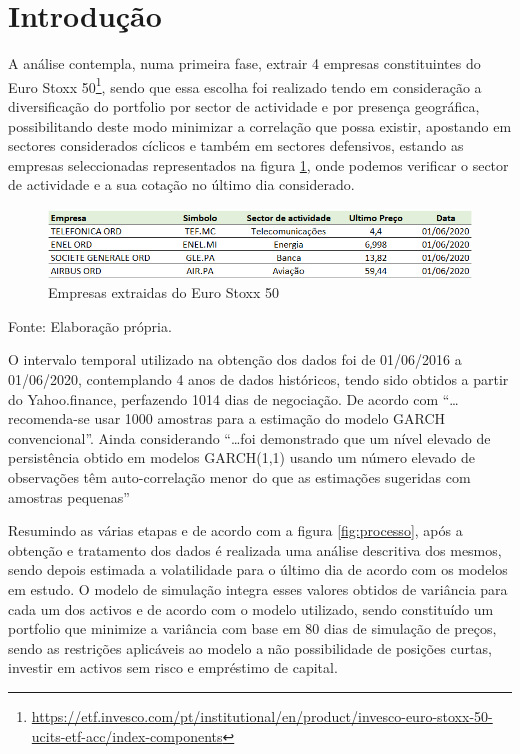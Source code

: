 \documentclass[
  12pt,
  a4paper,
  openany]{book}
\begin{document}
\newpage

\hypertarget{introduuxe7uxe3o-1}{%
\section{Introdução}\label{introduuxe7uxe3o-1}}

A análise contempla, numa primeira fase, extrair 4 empresas constituintes do Euro Stoxx 50\footnote{\url{https://etf.invesco.com/pt/institutional/en/product/invesco-euro-stoxx-50-ucits-etf-acc/index-components}}, sendo que essa escolha foi realizado tendo em consideração a diversificação do portfolio por sector de actividade e por presença geográfica, possibilitando deste modo minimizar a correlação que possa existir, apostando em sectores considerados cíclicos e também em sectores defensivos, estando as empresas seleccionadas representados na figura \ref{fig:empresas}, onde podemos verificar o sector de actividade e a sua cotação no último dia considerado.

\begin{figure}

{\centering \includegraphics[width=1\linewidth]{image/cotacao} 

}

\caption{Empresas extraidas do Euro Stoxx 50}\label{fig:empresas}
\end{figure}
\FloatBarrier
\centering

Fonte: Elaboração própria.

\justifying
\bigskip

O intervalo temporal utilizado na obtenção dos dados foi de 01/06/2016 a 01/06/2020, contemplando 4
anos de dados históricos, tendo sido obtidos a partir do Yahoo.finance, perfazendo 1014 dias de negociação. De acordo com \citet{NG2006} ``\ldots recomenda-se usar 1000 amostras para a estimação do modelo GARCH convencional''. Ainda considerando \citet{smallsample} ``\ldots foi demonstrado que um nível elevado de persistência obtido em modelos GARCH(1,1) usando um número elevado de observações têm auto-correlação menor do que as estimações sugeridas com amostras pequenas''

Resumindo as várias etapas e de acordo com a figura \ref{fig:processo}, após a obtenção e tratamento dos dados é realizada uma análise descritiva dos mesmos, sendo depois estimada a volatilidade para o último dia de acordo com os modelos em estudo. O modelo de simulação integra esses valores obtidos de variância para cada um dos activos e de acordo com o modelo utilizado, sendo constituído um portfolio que minimize a variância com base em 80 dias de simulação de preços, sendo as restrições aplicáveis ao modelo a não possibilidade de posições curtas, investir em activos sem risco e empréstimo de capital.
\end{document}
